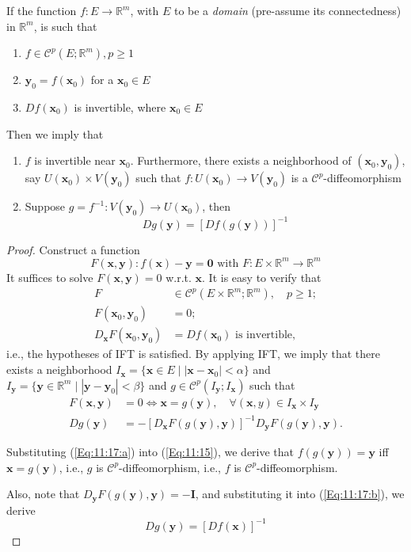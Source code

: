 \begin{theorem}
If the function $f:E\to\mathbb{R}^m$, with $E$ to be a \emph{domain} (pre-assume its connectedness) in $\mathbb{R}^m$, is such that
\begin{enumerate}
\item
$f\in\mathcal{C}^p(E;\mathbb{R}^m), p\ge1$
\item
$\bm y_0=f(\bm x_0)$ for a $\bm x_0\in E$
\item
$Df(\bm x_0)$ is invertible, where $\bm x_0\in E$
\end{enumerate}
Then we imply that
\begin{enumerate}
\item
$f$ is invertible near $\bm x_0$. Furthermore, there exists a neighborhood of $(\bm x_0,\bm y_0)$, say $U(\bm x_0)\times V(\bm y_0)$ such that $f: U(\bm x_0)\to V(\bm y_0)$ is a $\mathcal{C}^p$-diffeomorphism
\item
Suppose $g=f^{-1}: V(\bm y_0)\to U(\bm x_0)$, then
\[
Dg(\bm y)=[Df(g(\bm y))]^{-1}
\]
\end{enumerate}
\end{theorem}
\begin{proof}
Construct a function 
\begin{equation}\label{Eq:11:15}
F(\bm x,\bm y): f(\bm x)-\bm y=\bm0\mbox{ with $F:E\times\mathbb{R}^m\to\mathbb{R}^m$}
\end{equation}
It suffices to solve $F(\bm x,\bm y)=0$ w.r.t. $\bm x$. It is easy to verify that
\begin{subequations}
\begin{align}
F&\in\mathcal{C}^p(E\times\mathbb{R}^m;\mathbb{R}^m),\quad p\ge1;\\
F(\bm x_0,\bm y_0)&=0;\\
D_{\bm x}F(\bm x_0,\bm y_0) &= Df(\bm x_0)\mbox{ is invertible},
\end{align}
\end{subequations}
i.e., the hypotheses of IFT is satisfied. By applying IFT, we imply that there exists a neighborhood $I_{\bm x}=\{\bm x\in E\mid |\bm x-\bm x_0|<\alpha\}$ and $I_{\bm y}=\{\bm y\in\mathbb{R}^m\mid |\bm y-\bm y_0|<\beta\}$ and $g\in\mathcal{C}^p(I_{\bm y};I_{\bm x})$ such that
\begin{subequations}
\begin{align}
F(\bm x,\bm y)&=0\Longleftrightarrow
\bm x=g(\bm y),\quad\forall (\bm x,y)\in I_{\bm x}\times I_{\bm y}\label{Eq:11:17:a}\\
Dg(\bm y)&=-[D_{\bm x}F(g(\bm y), \bm y)]^{-1}D_{\bm y}F(g(\bm y),\bm y).	\label{Eq:11:17:b}
\end{align}
\end{subequations}

Substituting (\ref{Eq:11:17:a}) into (\ref{Eq:11:15}), we derive that $f(g(\bm y))=\bm y$ iff $\bm x=g(\bm y)$, i.e., $g$ is $\mathcal{C}^p$-diffeomorphism, i.e., $f$ is $\mathcal{C}^p$-diffeomorphism.

Also, note that $D_{\bm y}F(g(\bm y),\bm y)=-\bm I$, and substituting it into (\ref{Eq:11:17:b}), we derive
\[
Dg(\bm y)=[Df(\bm x)]^{-1}
\]
\end{proof}


